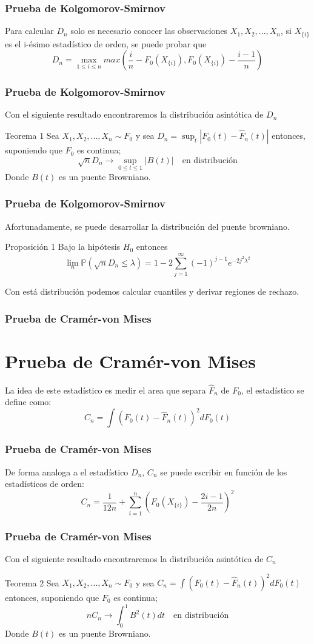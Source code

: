 \documentclass[aspectratio=169,spanish]{beamer}
\begin{document}
\begin{frame}
\frametitle{Prueba de Kolgomorov-Smirnov}
Para calcular $D_n$ solo es necesario conocer las observaciones $X_1,X_2,...,X_n$, si $X_{\{i\}}$ es el i-ésimo estadístico de orden, se puede probar que $$D_n =\max_{1\le i\le n}max(\frac{i}{n}-F_0(X_{\{i\}}),F_0(X_{\{i\}})-\frac{i-1}{n})$$
\end{frame}
\begin{frame}
\frametitle{Prueba de Kolgomorov-Smirnov}
Con el siguiente resultado encontraremos la distribución asintótica de $D_n$
\begin{block}{Teorema 1}
Sea $X_1,X_2,...,X_n\sim F_0$ y sea $D_n=\sup_{t}|F_0(t)-\hat{F}_n(t)|$ entonces, suponiendo que $F_0$ es continua; $$\sqrt{n}D_n \rightarrow \sup_{0\le t\le 1}|B(t)|\quad \text{en distribución}$$
Donde $B(t)$ es un puente Browniano.
\end{block}
\end{frame}

\begin{frame}
\frametitle{Prueba de Kolgomorov-Smirnov}
Afortunadamente, se puede desarrollar la distribución del puente browniano. 
\begin{block}{Proposición 1}
Bajo la hipótesis $H_0$ entonces 
$$\lim_{n}\mathbb{P}(\sqrt{n}D_n \le \lambda) =1-2\sum_{j=1}^{\infty}(-1)^{j-1}e^{-2j^2\lambda^2}$$
\end{block}
Con está distribución podemos calcular cuantiles y derivar regiones de rechazo.
\end{frame}


\begin{frame}
\frametitle{Prueba de Cramér-von Mises}
\section{Prueba de Cramér-von Mises}
La idea de este estadístico es medir el area que separa $\hat{F}_n$ de $F_0$, el estadístico se define como:
$$C_n=\int(F_0(t)-\hat{F}_n(t))^2dF_0(t)$$
\end{frame}
\begin{frame}
\frametitle{Prueba de Cramér-von Mises}
De forma analoga a el estadístico $D_n$, $C_n$ se puede escribir en función de los estadísticos de orden: 
$$C_n=\frac{1}{12n}+\sum_{i=1}^{n}\left(F_0(X_{\{i\}})-\frac{2i-1}{2n}\right)^2$$ 
\end{frame}
\begin{frame}
\frametitle{Prueba de Cramér-von Mises}
Con el siguiente resultado encontraremos la distribución asintótica de $C_n$
\begin{block}{Teorema 2}
Sea $X_1,X_2,...,X_n\sim F_0$ y sea $C_n=\int(F_0(t)-\hat{F}_n(t))^2dF_0(t)$ entonces, suponiendo que $F_0$ es continua; $$nC_n \rightarrow \int_0^1B^2(t)dt\quad \text{en distribución}$$
Donde $B(t)$ es un puente Browniano.
\end{block}
\end{frame}
\end{document}

